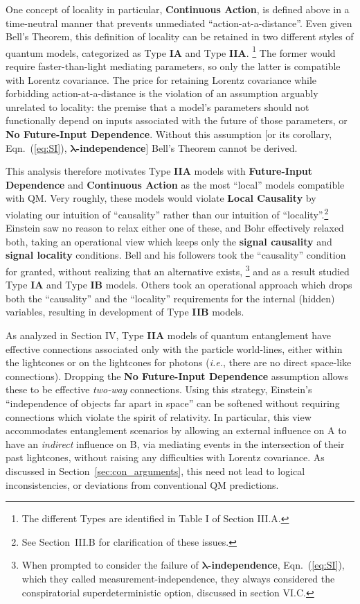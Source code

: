 \documentclass[onecolumn, nofootinbib, 12pt]{revtex4-1}
\begin{document}
One concept of locality in particular, {\bf Continuous Action}, is defined above in a time-neutral manner that prevents unmediated ``action-at-a-distance''.  Even given Bell's Theorem, this definition of locality can be retained in two different styles of quantum models, categorized as Type {\bf IA} and Type {\bf IIA}.%
\footnote{The different Types are identified in Table I of Section III.A.}
The former would require faster-than-light mediating parameters, so only the latter is compatible with Lorentz covariance.  The price for retaining Lorentz covariance while forbidding action-at-a-distance is the violation of an assumption arguably unrelated to locality: the premise that a model's parameters should not functionally depend on inputs associated with the future of those parameters, or {\bf No Future-Input Dependence}.  Without this assumption [or its corollary, Eqn.~(\ref{eq:SI}), {\bf $\bm{\lambda}$-independence}] Bell's Theorem cannot be derived.  

This analysis therefore motivates Type {\bf IIA} models with {\bf Future-Input Dependence} and {\bf Continuous Action} as the most ``local'' models compatible with QM.  Very roughly, these models would violate {\bf Local Causality} by violating our intuition of ``causality'' rather than our intuition of ``locality''.\footnote{See Section~III.B for clarification of these issues.}  
Einstein saw no reason to relax either one of these, and Bohr effectively relaxed both, taking an operational view which keeps only the {\bf signal causality} and {\bf signal locality} conditions.  Bell and his followers took the ``causality'' condition for granted, without realizing that an alternative exists,%
\footnote{When prompted to consider the failure of {\bf $\bm{\lambda}$-independence}, Eqn.~(\ref{eq:SI}), which they called measurement-independence, they always considered the conspiratorial superdeterministic option, discussed in section VI.C.}
and as a result studied Type {\bf IA} and Type {\bf IB} models.  Others took an operational approach which drops both the ``causality'' and the ``locality'' requirements for the internal (hidden) variables, resulting in development of Type {\bf IIB} models.

As analyzed in Section IV, Type {\bf IIA} models of quantum entanglement have effective connections associated only with the particle world-lines, either within the lightcones or on the lightcones for photons (\emph{i.e.}, there are no direct space-like connections).  Dropping the {\bf No Future-Input Dependence} assumption allows these to be effective \emph{two-way} connections.  Using this strategy, Einstein's ``independence of objects far apart in space'' can be softened without requiring connections which violate the spirit of relativity.  In particular, this view accommodates entanglement scenarios by allowing an external influence on A to have an \emph{indirect} influence on B, via mediating events in the intersection of their past lightcones, without raising any difficulties with Lorentz covariance.  As discussed in Section~\ref{sec:con_arguments}, this need not lead to logical inconsistencies, or deviations from conventional QM predictions.
\end{document}
